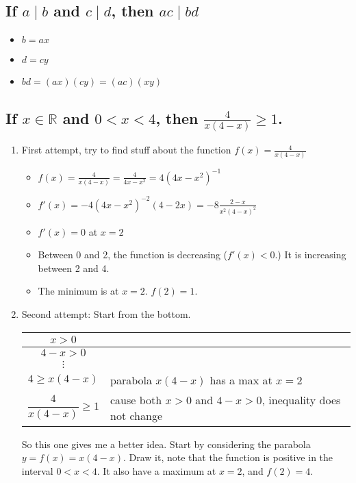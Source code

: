\documentclass[11pt, oneside]{amsart}
\begin{document}
\subsection{If \(a \mid b\) and \(c \mid d\), then \(ac \mid bd\)}
\label{sec:org8fd2af6}
\begin{itemize}
\item \(b=ax\)
\item \(d=cy\)
\item \(bd = (ax)(cy)=(ac)(xy)\)
\end{itemize}

\subsection{If \(x \in \mathbb{R}\) and \(0 < x < 4\), then \(\frac{4}{x(4-x)} \geq 1\).}
\label{sec:org47a5e18}

\begin{enumerate}
\item First attempt, try to find stuff about the function \(f(x) = \frac{4}{x(4-x)}\)
\label{sec:orgacdd75c}
\begin{itemize}
\item \(f(x) = \frac{4}{x(4-x)} = \frac{4}{4x-x^2} = 4(4x-x^2)^{-1}\)
\item \(f'(x) = -4(4x-x^2)^{-2}(4-2x) = -8\frac{2-x}{x^2(4-x)^2}\)
\item \(f'(x)=0\) at \(x=2\)
\item Between 0 and 2, the function is decreasing (\(f'(x)<0\).) It is increasing between 2 and 4.
\item The minimum is at \(x=2\). \(f(2)=1\).
\end{itemize}

\item Second attempt: Start from the bottom.
\label{sec:orgffbf44b}
\begin{center}
\begin{tabular}{|c|l|}
\hline
\(x>0\) & \\
\hline
\(4-x>0\) & \\
\hline
\(\vdots\) & \\
\hline
\(4 \geq x(4-x)\) & parabola \(x(4-x)\) has a max at \(x=2\)\\
\hline
\(\dfrac{4}{x(4-x)} \geq 1\) & cause both \(x>0\) and \(4-x>0\), inequality does not change\\
\hline
\end{tabular}
\end{center}

So this one gives me a better idea.  Start by considering the parabola \(y = f(x) = x(4-x)\).  Draw it, note that the
function is positive in the interval \(0<x<4\).  It also have a maximum at \(x=2\), and \(f(2) = 4\).
\end{enumerate}
\end{document}
